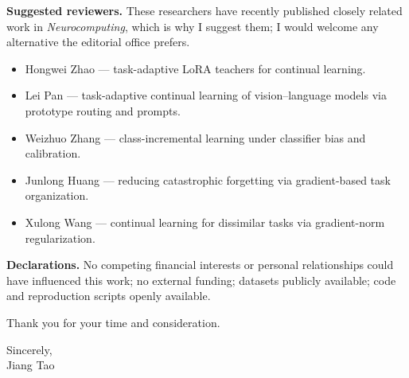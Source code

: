 \documentclass[10pt]{article}
\begin{document}
\textbf{Suggested reviewers.} These researchers have recently published closely related
work in \emph{Neurocomputing}, which is why I suggest them; I would welcome any
alternative the editorial office prefers.
\begin{itemize}
  \item Hongwei Zhao --- task-adaptive LoRA teachers for continual learning.
  \item Lei Pan --- task-adaptive continual learning of vision--language models via
        prototype routing and prompts.
  \item Weizhuo Zhang --- class-incremental learning under classifier bias and calibration.
  \item Junlong Huang --- reducing catastrophic forgetting via gradient-based task
        organization.
  \item Xulong Wang --- continual learning for dissimilar tasks via gradient-norm
        regularization.
\end{itemize}

\textbf{Declarations.} No competing financial interests or personal relationships could
have influenced this work; no external funding; datasets publicly available; code and
reproduction scripts openly available.

\vspace{0.5em}
Thank you for your time and consideration.

\vspace{1em}
Sincerely,\\
Jiang Tao
\end{document}
